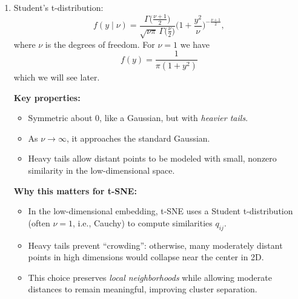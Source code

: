 \documentclass{article}
\begin{document}
\begin{enumerate}
\begin{enumerate}
\textbf{Why this matters for t-SNE:}

\begin{itemize}
\item t-SNE models the \emph{similarity between points} in high-dimensional space using conditional probabilities $p_{j|i}$.
\item These probabilities are computed using a Gaussian centered at each point: nearby points get higher probability, distant points lower.
\item The Gaussian’s variance $\sigma_i$ controls the effective neighborhood size per data point, tuned via \emph{perplexity}.
\item Thus, understanding Gaussians is essential to grasp how t-SNE measures "local closeness" before mapping to a lower dimension.
\item Gaussian's are non-linear giving this feature to t-SNE.
\end{itemize}

\item Student's t-distribution:
\[
f(y \mid \nu) = \frac{\Gamma\Big(\frac{\nu+1}{2}\Big)}{\sqrt{\nu \pi} \, \Gamma\Big(\frac{\nu}{2}\Big)} \Big( 1 + \frac{y^2}{\nu} \Big)^{-\frac{\nu+1}{2}},
\]
where $\nu$ is the degrees of freedom. For $\nu=1$ we have
\[
f(y) = \frac{1}{\pi(1+y^2)}
\]
which we will see later.

\textbf{Key properties:}
\begin{itemize}
\item Symmetric about 0, like a Gaussian, but with \emph{heavier tails}.
\item As $\nu \to \infty$, it approaches the standard Gaussian.
\item Heavy tails allow distant points to be modeled with small, nonzero similarity in the low-dimensional space.
\end{itemize}

\textbf{Why this matters for t-SNE:}
\begin{itemize}
\item In the low-dimensional embedding, t-SNE uses a Student t-distribution (often $\nu=1$, i.e., Cauchy) to compute similarities $q_{ij}$.
\item Heavy tails prevent “crowding”: otherwise, many moderately distant points in high dimensions would collapse near the center in 2D.
\item This choice preserves \emph{local neighborhoods} while allowing moderate distances to remain meaningful, improving cluster separation.
\end{itemize}


\end{enumerate}
\end{enumerate}
\end{document}
